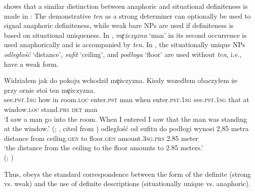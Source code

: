 \documentclass[output=paper]{langscibook}
\begin{document}
\noindent \citet{Czardybon2017} shows that a similar distinction between anaphoric and situational definiteness is made in : The demonstrative \textit{ten} as a strong determiner can optionally be used to signal anaphoric definiteness, while weak bare NPs are used if definiteness is based on situational uniqueness. In , \textit{mȩżczyzna} `man' in its second occurrence is used anaphorically and is accompanied by \textit{ten}. In , the situationally unique NPs \textit{odległość} `distance', \textit{sufit} `ceiling’, and \textit{podłoga} `floor' are used without \textit{ten}, i.e., have a weak form.

    \largerpage[-2] %

\ea \label{ex:8}
\ea
\gll Widziałem jak do pokoju wchodził mȩżczyzna. Kiedy wszedłem obaczyłem że przy ornie stoi ten mȩżczyzna. \\
    see.\textsc{pst}.1\textsc{sg} how in room.\textsc{loc} enter.\textsc{pst} man when enter.\textsc{pst}.1\textsc{sg} see.\textsc{pst}.1\textsc{sg} that at window.\textsc{loc} stand.\textsc{prs} \textsc{det} man\\
\glt `I saw a man go into the room. When I entered I saw that the man was standing at the window.' \glt \hfill (; \citealt[96--97]{Szwedek1976}, cited from \citealt[50]{Czardybon2017})\label{ex:8a}
\ex \gll [\dots] odległość od sufitu do podłogi wynosi 2,85 metra \\
 {} distance from ceiling.\textsc{gen} to floor.\textsc{gen} amount.3\textsc{sg.prs} 2.85 meter\\
\glt `the distance from the ceiling to the floor amounts to 2.85 meters.' \\
\glt \hfill (; \citealt[74]{Czardybon2017}) \label{ex:8b}
\z
\z

\noindent Thus,  obeys the standard correspondence between the form of the definite (strong vs. weak) and the use of definite descriptions (situationally unique vs. anaphoric).
\end{document}
